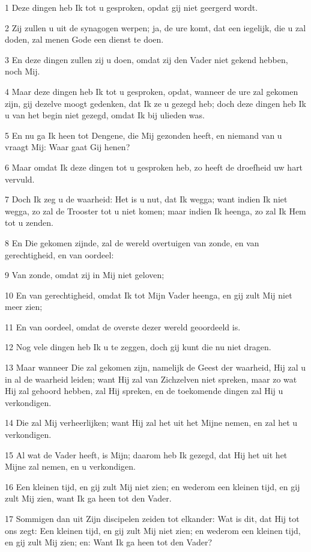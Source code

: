 \par 1 Deze dingen heb Ik tot u gesproken, opdat gij niet geergerd wordt.
\par 2 Zij zullen u uit de synagogen werpen; ja, de ure komt, dat een iegelijk, die u zal doden, zal menen Gode een dienst te doen.
\par 3 En deze dingen zullen zij u doen, omdat zij den Vader niet gekend hebben, noch Mij.
\par 4 Maar deze dingen heb Ik tot u gesproken, opdat, wanneer de ure zal gekomen zijn, gij dezelve moogt gedenken, dat Ik ze u gezegd heb; doch deze dingen heb Ik u van het begin niet gezegd, omdat Ik bij ulieden was.
\par 5 En nu ga Ik heen tot Dengene, die Mij gezonden heeft, en niemand van u vraagt Mij: Waar gaat Gij henen?
\par 6 Maar omdat Ik deze dingen tot u gesproken heb, zo heeft de droefheid uw hart vervuld.
\par 7 Doch Ik zeg u de waarheid: Het is u nut, dat Ik wegga; want indien Ik niet wegga, zo zal de Trooster tot u niet komen; maar indien Ik heenga, zo zal Ik Hem tot u zenden.
\par 8 En Die gekomen zijnde, zal de wereld overtuigen van zonde, en van gerechtigheid, en van oordeel:
\par 9 Van zonde, omdat zij in Mij niet geloven;
\par 10 En van gerechtigheid, omdat Ik tot Mijn Vader heenga, en gij zult Mij niet meer zien;
\par 11 En van oordeel, omdat de overste dezer wereld geoordeeld is.
\par 12 Nog vele dingen heb Ik u te zeggen, doch gij kunt die nu niet dragen.
\par 13 Maar wanneer Die zal gekomen zijn, namelijk de Geest der waarheid, Hij zal u in al de waarheid leiden; want Hij zal van Zichzelven niet spreken, maar zo wat Hij zal gehoord hebben, zal Hij spreken, en de toekomende dingen zal Hij u verkondigen.
\par 14 Die zal Mij verheerlijken; want Hij zal het uit het Mijne nemen, en zal het u verkondigen.
\par 15 Al wat de Vader heeft, is Mijn; daarom heb Ik gezegd, dat Hij het uit het Mijne zal nemen, en u verkondigen.
\par 16 Een kleinen tijd, en gij zult Mij niet zien; en wederom een kleinen tijd, en gij zult Mij zien, want Ik ga heen tot den Vader.
\par 17 Sommigen dan uit Zijn discipelen zeiden tot elkander: Wat is dit, dat Hij tot ons zegt: Een kleinen tijd, en gij zult Mij niet zien; en wederom een kleinen tijd, en gij zult Mij zien; en: Want Ik ga heen tot den Vader?
